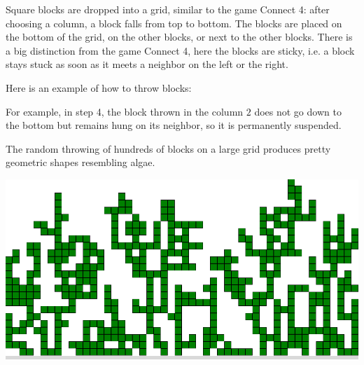 \documentclass[11pt,class=report,crop=false]{standalone}
\begin{document}
\begin{cours}
Square blocks are dropped into a grid, similar to the game \og{}Connect 4\fg{}: after choosing a column, a block falls from top to bottom. The blocks are placed on the bottom of the grid, on the other blocks, or next to the other blocks. There is a big distinction from the game \og{}Connect 4\fg{}, here the blocks are \og{}sticky\fg{}, i.e. a block stays stuck as soon as it meets a neighbor on the left or the right.


Here is an example of how to throw blocks:

For example, in step 4, the block thrown in the column $2$ does not go down to the bottom but remains hung on its neighbor, so it is permanently suspended.

The random throwing of hundreds of blocks on a large grid produces pretty geometric shapes resembling algae.

\begin{center}
\includegraphics[scale=\myscale,scale=0.3]{screen-blocks-bloc0}
\end{center}

\end{cours}



\end{document}
